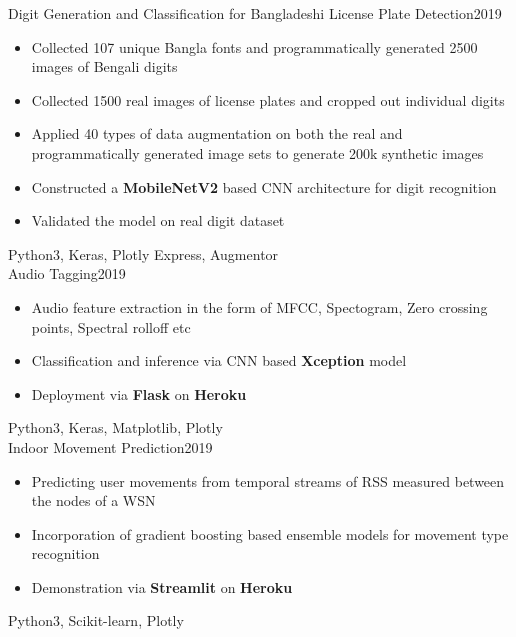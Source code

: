 %
%
%




\begin{projects}
	\project
	{Digit Generation and Classification for Bangladeshi License Plate Detection}{2019}
	{}
	{\vspace{-3mm}
	\begin{itemize}
	\item Collected 107 unique Bangla fonts and programmatically generated 2500 images of Bengali digits
	    \item Collected 1500 real images of license plates and cropped out individual digits 
	    \item Applied 40 types of data augmentation on both the real and programmatically generated image sets to generate 200k synthetic images 
	    \item Constructed a \textbf{MobileNetV2} based CNN architecture for digit recognition
	    \item Validated the model on real digit dataset
	\end{itemize}
	}
	{Python3, Keras, Plotly Express, Augmentor}\\
				
	\project
	{Audio Tagging}{2019}
	{}
	{\vspace{-3mm}   
	\begin{itemize}
	    \item Audio feature extraction in the form of MFCC,  Spectogram, Zero crossing points, Spectral rolloff etc
	    \item Classification and inference via CNN based \textbf{Xception} model
	    \item Deployment via \textbf{Flask} on \textbf{Heroku}
	\end{itemize}
	}
	{Python3, Keras, Matplotlib, Plotly}\\
	
	\project
	{Indoor Movement Prediction}{2019}
	{}
	{\vspace{-3mm}
	\begin{itemize}
	    \item Predicting user movements from temporal streams of RSS measured between the nodes of a WSN
	    \item Incorporation of gradient boosting based ensemble models for movement type recognition
	    \item Demonstration via \textbf{Streamlit} on \textbf{Heroku}
	\end{itemize}
	}
	{Python3, Scikit-learn, Plotly}\\
	

\end{projects}
